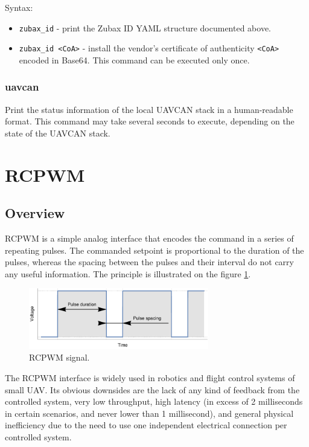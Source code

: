 \documentclass{zubaxdoc}
\begin{document}
Syntax:
\begin{itemize}
\item \verb|zubax_id| - print the Zubax ID YAML structure documented above.
\item \verb|zubax_id <CoA>| - install the vendor's certificate of authenticity \verb|<CoA>| encoded in Base64.
This command can be executed only once.
\end{itemize}

\subsubsection{uavcan}

Print the status information of the local UAVCAN stack in a human-readable format.
This command may take several seconds to execute, depending on the state of the UAVCAN stack.

\section{RCPWM}

\subsection{Overview}

RCPWM is a simple analog interface that encodes the command in a series of repeating pulses.
The commanded setpoint is proportional to the duration of the pulses,
whereas the spacing between the pulses and their interval do not carry any useful information.
The principle is illustrated on the figure \ref{rcpwm_signal_plot}.

\begin{figure}[hbt]
    \centering
	\includegraphics[width=0.7\textwidth]{rcpwm_signal_plot}
	\caption{RCPWM signal.
	\label{rcpwm_signal_plot}}
\end{figure}

The RCPWM interface is widely used in robotics and flight control systems of small UAV.
Its obvious downsides are the lack of any kind of feedback from the controlled system,
very low throughput,
high latency (in excess of 2 milliseconds in certain scenarios, and never lower than 1 millisecond),
and general physical inefficiency due to the need to use one independent electrical connection
per controlled system.
\end{document}
